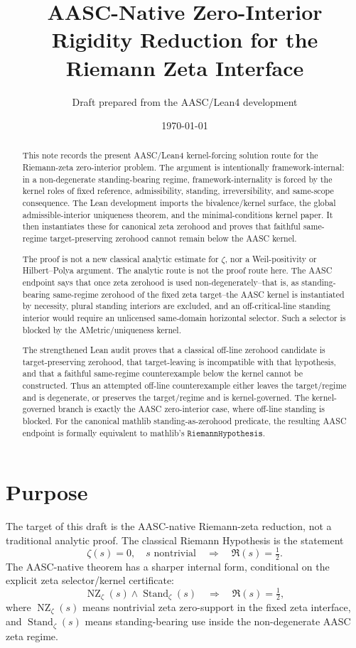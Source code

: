 \documentclass[11pt]{article}
\title{AASC-Native Zero-Interior Rigidity Reduction for the Riemann Zeta Interface}
\author{Draft prepared from the AASC/Lean4 development}
\date{\today}
\newcommand{\Half}{\tfrac12}
\newcommand{\Stand}{\operatorname{Stand}}
\newcommand{\NZ}{\operatorname{NZ}}
\begin{document}
\maketitle

\begin{abstract}
This note records the present AASC/Lean4 kernel-forcing solution route for the
Riemann-zeta zero-interior problem.  The argument is intentionally
framework-internal: in a non-degenerate standing-bearing regime,
framework-internality is forced by the kernel roles of fixed reference,
admissibility, standing, irreversibility, and same-scope consequence.  The Lean
development imports the bivalence/kernel surface, the global
admissible-interior uniqueness theorem, and the minimal-conditions kernel
paper.  It then instantiates these for canonical zeta zerohood and proves that
faithful same-regime target-preserving zerohood cannot remain below the AASC
kernel.

The proof is not a new classical analytic estimate for \(\zeta\), nor a
Weil-positivity or Hilbert--Polya argument.  The analytic route is not the
proof route here.  The AASC endpoint says that once zeta zerohood is used
non-degenerately--that is, as standing-bearing same-regime zerohood of the
fixed zeta target--the AASC kernel is instantiated by necessity, plural
standing interiors are excluded, and an off-critical-line standing interior
would require an unlicensed same-domain horizontal selector.  Such a selector
is blocked by the AMetric/uniqueness kernel.

The strengthened Lean audit proves that a classical off-line zerohood candidate
is target-preserving zerohood, that target-leaving is incompatible with that
hypothesis, and that a faithful same-regime counterexample below the kernel
cannot be constructed.  Thus an attempted off-line counterexample either leaves
the target/regime and is degenerate, or preserves the target/regime and is
kernel-governed.  The kernel-governed branch is exactly the AASC zero-interior
case, where off-line standing is blocked.  For the canonical mathlib
standing-as-zerohood predicate, the resulting AASC endpoint is formally
equivalent to mathlib's \(\texttt{RiemannHypothesis}\).
\end{abstract}

\section{Purpose}

The target of this draft is the AASC-native Riemann-zeta reduction, not a
traditional analytic proof.  The classical Riemann Hypothesis is the statement
\[
  \zeta(s)=0,\quad s \text{ nontrivial}
  \quad\Longrightarrow\quad
  \Re(s)=\Half.
\]
The AASC-native theorem has a sharper internal form, conditional on the
explicit zeta selector/kernel certificate:
\[
  \NZ_{\zeta}(s) \wedge \Stand_{\zeta}(s)
  \quad\Longrightarrow\quad
  \Re(s)=\Half,
\]
where \(\NZ_{\zeta}(s)\) means nontrivial zeta zero-support in the fixed zeta
interface, and \(\Stand_{\zeta}(s)\) means standing-bearing use inside the
non-degenerate AASC zeta regime.
\end{document}
